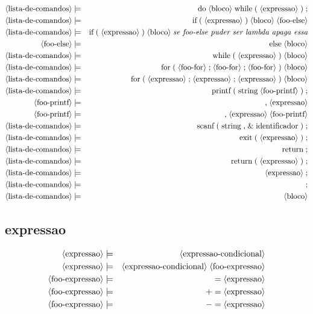 \documentclass[12pt,a4papper]{article}
\newcommand{\pn}[1]{\langle \textnormal{#1} \rangle}
\newcommand{\pp}{\models}
\newcommand{\ww}{\;}
\newcommand{\sm}[1]{\textnormal{#1}}
\newcommand{\sd}[1]{\textnormal{\it #1}}
\begin{document}
\begin{landscape}
\begin{eqnarray}
\pn{lista-de-comandos} &\pp& \sm{do} \ww \pn{bloco} \ww \sm{while} \ww \sm{(} \ww \pn{expressao} \ww \sm{)} \ww \sm{;} \\
\pn{lista-de-comandos} &\pp& \sm{if} \ww \sm{(} \ww \pn{expressao} \ww \sm{)} \ww \pn{bloco} \ww \pn{foo-else} \\
\pn{lista-de-comandos} &\pp& \sm{if} \ww \sm{(} \ww \pn{expressao} \ww \sm{)} \ww \pn{bloco} \ww \sd{se foo-else puder ser lambda apaga essa} \\
\pn{foo-else} &\pp& \sm{else} \ww \pn{bloco} \\  
\pn{lista-de-comandos} &\pp& \sm{while} \ww \sm{(} \ww \pn{expressao} \ww \sm{)} \ww \pn{bloco}\\
\pn{lista-de-comandos} &\pp& \sm{for} \ww \sm{(} \ww \pn{foo-for} \ww \sm{;} \ww \pn{foo-for} \ww \sm{;} \ww \pn{foo-for} \ww \sm{)} \ww \pn{bloco}   \\
\pn{lista-de-comandos} &\pp& \sm{for} \ww \sm{(} \ww \pn{expressao} \ww \sm{;} \ww \pn{expressao} \ww \sm{;} \ww \pn{expressao} \ww \sm{)} \ww \pn{bloco}   \\
\pn{lista-de-comandos} &\pp& \sm{printf} \ww \sm{(} \ww \sm{string} \ww \pn{foo-printf} \ww \sm{)} \ww \sm{;}\\
       \pn{foo-printf} &\pp&  \sm{,} \ww \pn{expressao} \\
       \pn{foo-printf} &\pp&  \sm{,} \ww \pn{expressao} \ww \pn{foo-printf}\\
\pn{lista-de-comandos} &\pp&  \sm{scanf} \ww \sm{(} \ww \sm{string} \ww \sm{,} \ww \sm{\&} \ww \sm{identificador} \ww \sm{)} \ww \sm{;} \\
\pn{lista-de-comandos} &\pp&  \sm{exit} \ww \sm{(} \ww \pn{expressao} \ww \sm{)} \ww \sm{;} \\
\pn{lista-de-comandos} &\pp&  \sm{return} \ww \sm{;} \\
\pn{lista-de-comandos} &\pp&  \sm{return} \ww \sm{(} \ww \pn{expressao} \ww \sm{)} \ww  \sm{;} \\
\pn{lista-de-comandos} &\pp&  \pn{expressao} \ww \sm{;} \\
\pn{lista-de-comandos} &\pp&  \sm{;} \\
\pn{lista-de-comandos} &\pp&  \pn{bloco}
\end{eqnarray}



\subsection{expressao}
\begin{eqnarray}
\pn{expressao} &\pp& \pn{expressao-condicional} \\
\pn{expressao} &\pp& \pn{expressao-condicional} \ww \pn{foo-expressao} \\
          \pn{foo-expressao} &\pp& \sm{$=$} \ww \pn{expressao} \\
          \pn{foo-expressao} &\pp& \sm{$+=$} \ww \pn{expressao} \\
          \pn{foo-expressao} &\pp& \sm{$-=$} \ww \pn{expressao} \\
\end{eqnarray}



\end{landscape}
\end{document}
